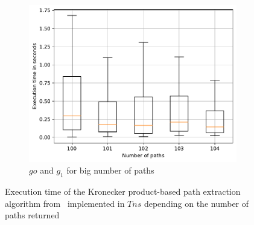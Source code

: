\begin{figure}
	\begin{subfigure}{0.32\textwidth}
		\includegraphics[width=\linewidth,trim=0 0 -1.5cm 0]{pictures/tensor_go_10_big.pdf}
		\caption{$go$ and $g_1$ for big number of paths} \label{fig:extractTimeGoBigTns}
	\end{subfigure}
	\caption{Execution time of the Kronecker product-based path extraction algorithm from~\cite{kron} implemented in $Tns$ depending on the number of paths returned}
	\label{fig:extractTimeTns}
\end{figure}

